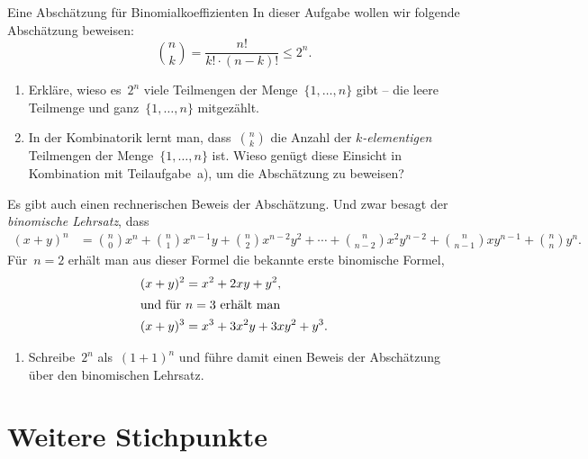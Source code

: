 \documentclass[twoside]{../zirkelblatt1415}
\theoremstyle{definition}
\theoremstyle{plain}
\theoremstyle{remark}
\begin{document}
\begin{aufgabe}{Eine Abschätzung für Binomialkoeffizienten}
In dieser Aufgabe wollen wir folgende Abschätzung beweisen:
\[ \binom{n}{k} = \frac{n!}{k! \cdot (n-k)!} \leq 2^n. \]
\begin{enumerate}
\item Erkläre, wieso es~$2^n$ viele Teilmengen der Menge~$\{1,\ldots,n\}$ gibt
-- die leere Teilmenge und ganz~$\{1,\ldots,n\}$ mitgezählt.
\item In der Kombinatorik lernt man, dass~$\binom{n}{k}$ die Anzahl der
\emph{$k$-elementigen} Teilmengen der Menge~$\{1,\ldots,n\}$ ist. Wieso genügt
diese Einsicht in Kombination mit Teilaufgabe~a), um die Abschätzung zu
beweisen?
\end{enumerate}
Es gibt auch einen rechnerischen Beweis der Abschätzung. Und zwar besagt
der \emph{binomische Lehrsatz}, dass
\begin{align*}
  (x+y)^n &= \textstyle \binom{n}{0} x^n + \binom{n}{1} x^{n-1} y
  + \binom{n}{2} x^{n-2} y^2 +
  \cdots
  +
  \binom{n}{n-2} x^2 y^{n-2} +
  \binom{n}{n-1} x y^{n-1} +
  \binom{n}{n} y^n.
\end{align*}
Für~$n = 2$ erhält man aus dieser Formel die bekannte erste binomische Formel,
\begin{align*}
  (x+y)^2 &= x^2 + 2xy + y^2, \\
\intertext{und für~$n = 3$ erhält man}
  (x+y)^3 &= x^3 + 3x^2y + 3xy^2 + y^3.
\end{align*}
\begin{enumerate}
\addtocounter{enumi}{2}
\item Schreibe~$2^n$ als~$(1 + 1)^n$ und führe damit einen Beweis der
Abschätzung über den binomischen Lehrsatz.
\end{enumerate}\fixlistspacing
\end{aufgabe}


\section{Weitere Stichpunkte}
\end{document}

